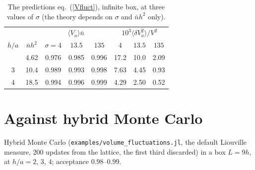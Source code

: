 \documentclass[11pt,aps,preprint,nofootinbib,superscriptaddress,tightenlines]{revtex4-2}
\newcommand{\avg}[1]{\langle #1\rangle}
\def\Eq#1{eq.~(\ref{#1})}
\begin{document}
\begin{table}[h]
\caption{The predictions \Eq{Vfluct}, infinite box, at three values of $\sigma$ (the theory depends on $\sigma$ and $\bar nh^2$ only).}
\label{tab:predict}
\begin{ruledtabular}
\begin{tabular}{cc ccc ccc}
 & & \multicolumn{3}{c}{$\avg{V_a}\bar n$} & \multicolumn{3}{c}{$10^3\avg{\delta V_a^2}/V^2$} \\
$h/a$ & $\bar nh^2$ & $\sigma=4$ & $13.5$ & $135$ & $4$ & $13.5$ & $135$ \\
\colrule
2 & 4.62 & 0.976 & 0.985 & 0.996 & 17.2 & 10.0 & 2.09 \\
3 & 10.4 & 0.989 & 0.993 & 0.998 & 7.63 & 4.45 & 0.93 \\
4 & 18.5 & 0.994 & 0.996 & 0.999 & 4.29 & 2.50 & 0.52 \\
\end{tabular}
\end{ruledtabular}
\end{table}

\section{Against hybrid Monte Carlo}
\label{sec:test}

Hybrid Monte Carlo (\texttt{examples/volume\_fluctuations.jl}, the default Liouville measure, 200 updates from the lattice, the first third
discarded) in a box $L=9h$, at $h/a=2$, $3$, $4$; acceptance $0.98$--$0.99$.
\end{document}
